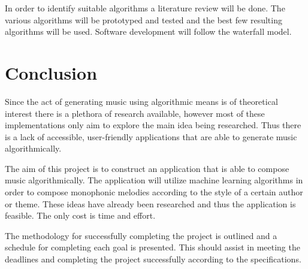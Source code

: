 In order to identify suitable algorithms a literature review will be done. The various algorithms will be prototyped and tested and the best few resulting algorithms will be used. Software development will follow the waterfall model.

\pagebreak
\section{Conclusion}
Since the act of generating music using algorithmic means is of theoretical interest there is a plethora of research available, however most of these implementations only aim to explore the main idea being researched. Thus there is a lack of accessible, user-friendly applications that are able to generate music algorithmically.

The aim of this project is to construct an application that is able to compose music algorithmically. The application will utilize machine learning algorithms in order to compose monophonic melodies according to the style of a certain author or theme. These ideas have already been researched and thus the application is feasible. The only cost is time and effort.

The methodology for successfully completing the project is outlined and a schedule for completing each goal is presented. This should assist in meeting the deadlines and completing the project successfully according to the specifications. 